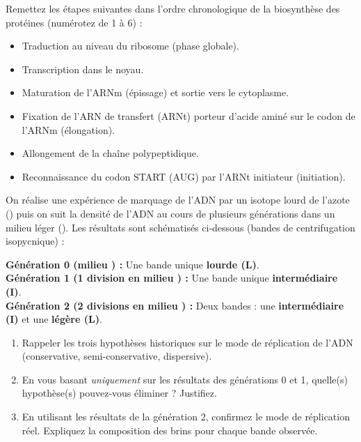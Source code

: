 \documentclass[11pt]{article}
\newcounter{popsec}
\newcounter{popsub}
\newcommand{\courssub}[1]{%
  \stepcounter{popsub}%
  \par\vspace{9pt}\noindent{\popxbold\fontsize{11.5}{13}\selectfont\color{popink}{\color{poporange}\thepopsec.\thepopsub}\hspace{6pt}#1}\par\nopagebreak\vspace{4pt}
}
\begin{document}
\begin{exercice}
Remettez les étapes suivantes dans l'ordre chronologique de la biosynthèse des protéines (numérotez de 1 à 6) :
\begin{itemize}
    \item[] Traduction au niveau du ribosome (phase globale).
    \item[] Transcription dans le noyau.
    \item[] Maturation de l'ARNm (épissage) et sortie vers le cytoplasme.
    \item[] Fixation de l'ARN de transfert (ARNt) porteur d'acide aminé sur le codon de l'ARNm (élongation).
    \item[] Allongement de la chaîne polypeptidique.
    \item[] Reconnaissance du codon START (AUG) par l'ARNt initiateur (initiation).
\end{itemize}
\end{exercice}

\courssub{Je m'entraîne}

\begin{exercice}
On réalise une expérience de marquage de l'ADN par un isotope lourd de l'azote () puis on suit la densité de l'ADN au cours de plusieurs générations dans un milieu léger (). Les résultats sont schématisés ci-dessous (bandes de centrifugation isopycnique) :

\textbf{Génération 0 (milieu ) :} Une bande unique \textbf{lourde (L)}. \\
\textbf{Génération 1 (1 division en milieu ) :} Une bande unique \textbf{intermédiaire (I)}. \\
\textbf{Génération 2 (2 divisions en milieu ) :} Deux bandes : une \textbf{intermédiaire (I)} et une \textbf{légère (L)}.
\begin{enumerate}
    \item Rappeler les trois hypothèses historiques sur le mode de réplication de l'ADN (conservative, semi-conservative, dispersive).
    \item En vous basant \emph{uniquement} sur les résultats des générations 0 et 1, quelle(s) hypothèse(s) pouvez-vous éliminer ? Justifiez.
    \item En utilisant les résultats de la génération 2, confirmez le mode de réplication réel. Expliquez la composition des brins pour chaque bande observée.
\end{enumerate}
\end{exercice}
\end{document}
